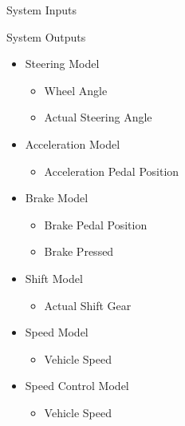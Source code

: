 \documentclass{beamer}
\begin{document}
\begin{frame}
\begin{minipage}[t]{0.48\linewidth}
\begin{block}{System Inputs}
	\end{block}
\end{minipage}%
\hfill%
\begin{minipage}[t]{0.48\linewidth}
\begin{block}{System Outputs}
		\begin{itemize}
			\tiny
		    \item Steering Model
		    \begin{itemize}
		    \tiny
		    		\item Wheel Angle
		    		\item Actual Steering Angle
		    \end{itemize}
		    \item Acceleration Model
		    \begin{itemize}
		    \tiny
		    		\item Acceleration Pedal Position
		    \end{itemize}
		    \item Brake Model
		    \begin{itemize}
		    \tiny
		    		\item Brake Pedal Position
		    		\item Brake Pressed
		    \end{itemize}
		    \item Shift Model
		    \begin{itemize}
		    \tiny
		    		\item Actual Shift Gear
		    \end{itemize}
		    \item Speed Model
		    \begin{itemize}
		    \tiny
		    		\item Vehicle Speed
		    \end{itemize}
		    \item Speed Control Model
		    \begin{itemize}
		    \tiny
		    		\item Vehicle Speed
		    \end{itemize}
		\end{itemize}
	\end{block}
\end{minipage}
\end{frame}
\end{document}
